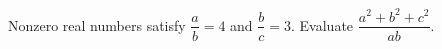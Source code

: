 Nonzero real numbers satisfy $\dfrac{a}{b}=4$ and $\dfrac{b}{c}=3$. Evaluate $\dfrac{a^2+b^2+c^2}{ab}$.
